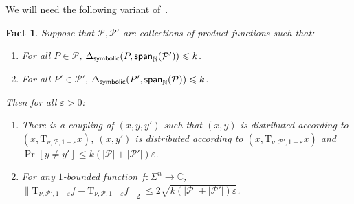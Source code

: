 \documentclass[10pt,a4paper]{amsart}
\newtheorem{fact}[thm]{Fact}
\newcommand\card[1]{\left| {#1} \right|}
\newcommand\Prob[2]{{\Pr_{#1}\left[ {#2} \right]}}
\newcommand\norm[1]{\| #1 \|}
\newcommand\spn{{\sf span}_{\mathbb{N}}}
\newcommand\eps{\varepsilon}
\renewcommand\leq{\leqslant}
\begin{document}
        We will need the following variant of~\cite[Fact 4.3]{BKM5}.
\begin{fact}\label{fact:noise_op_basic_prop2}
    Suppose that $\mathcal{P},\mathcal{P}'$ are collections of product functions such that:
    \begin{enumerate}
        \item For all $P\in \mathcal{P}$, $\Delta_{{\sf symbolic}}(P,\spn(\mathcal{P}'))\leq k$.
        \item For all $P'\in \mathcal{P}'$, $\Delta_{{\sf symbolic}}(P',\spn(\mathcal{P}))\leq k$.
    \end{enumerate}
           Then for all $\eps>0$:
        \begin{enumerate}
			\item There is a coupling of $(x, y, y')$ such that $(x,y)$ is distributed according to $(x, \mathrm{T}_{\nu, \mathcal{P}, 1-\eps} x)$,
			$(x,y')$ is distributed according to $(x, \mathrm{T}_{\nu, \mathcal{P}', 1-\eps}x)$ and $\Prob{}{y\neq y'}\leq k(\card{\mathcal{P}}+|\mathcal{P}'|)\eps$.
			\item For any $1$-bounded function $f\colon \Sigma^n\to\mathbb{C}$,
			$\norm{\mathrm{T}_{\nu, \mathcal{P}', 1-\eps} f - \mathrm{T}_{\nu, \mathcal{P}, 1-\eps} f}_2\leq 2\sqrt{k(\card{\mathcal{P}}+|\mathcal{P}'|)\eps}$.
		\end{enumerate}
\end{fact}
\end{document}
